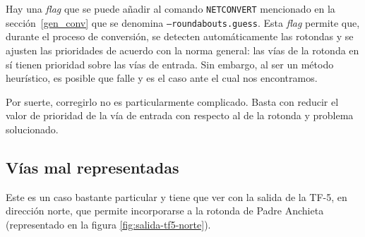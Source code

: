 Hay una \textit{flag} que se puede añadir al comando \texttt{NETCONVERT} mencionado en la sección~\ref{gen_conv} que se denomina \texttt{--roundabouts.guess}. Esta \textit{flag} permite que, durante el proceso de conversión, se detecten automáticamente las rotondas y se ajusten las prioridades de acuerdo con la norma general: las vías de la rotonda en sí tienen prioridad sobre las vías de entrada. Sin embargo, al ser un método heurístico, es posible que falle y es el caso ante el cual nos encontramos.

Por suerte, corregirlo no es particularmente complicado. Basta con reducir el valor de prioridad de la vía de entrada con respecto al de la rotonda y problema solucionado.

\subsection{Vías mal representadas}

Este es un caso bastante particular y tiene que ver con la salida de la TF-5, en dirección norte, que permite incorporarse a la rotonda de Padre Anchieta (representado en la figura \ref{fig:salida-tf5-norte}). 

